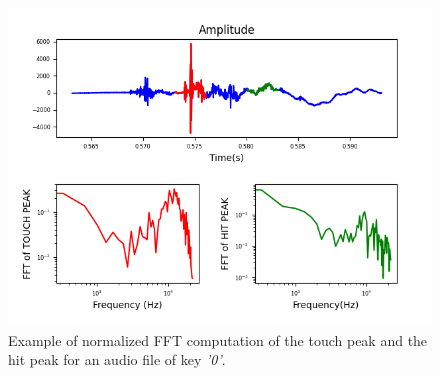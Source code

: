 \begin{figure}[h]
     \centering
     \includegraphics[width=.9\linewidth]{Images/Design/feature_example}
     \caption{\footnotesize{Example of normalized FFT computation of the touch peak and the hit peak for an audio file of key \textit{'0'}.}}\label{AcCAPPCHA:feature_example}
\end{figure}

